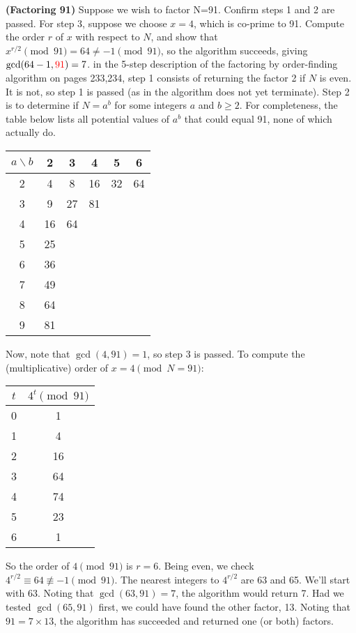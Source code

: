  \textbf{(Factoring 91)} Suppose we wish to factor N=91.  Confirm steps 1 and 2 are passed.  For step 3, suppose we choose $x=4$, which is co-prime to 91.  Compute the order $r$ of $x$ with respect to $N$, and show that $x^{r/2}\pmod{91}=64 \neq -1 \pmod{91}$, so the algorithm succeeds, giving $\gcd(64-1,{\color{red}91})=7$.
\Soln in the 5-step description of the factoring by order-finding algorithm on pages 233,234, step 1 consists of returning the factor 2 if $N$ is even.  It is not, so step 1 is passed (as in the algorithm does not yet terminate).  Step 2 is to determine if $N=a^b$ for some integers $a$ and $b\geq 2$.  For completeness, the table below lists all potential values of $a^b$ that could equal 91, none of which actually do.
\vspace{-8pt}
\begin{center}
\begin{tabular}{|c||c|c|c|c|c|}
\hline
$a \backslash b$ & 2 & 3 & 4 & 5 & 6 \\
\hline
\hline
2 & 4 & 8 & 16 & 32 & 64\\
\hline
3 & 9 & 27 & 81 \\
\hline
4 & 16 & 64 \\
\hline
5 & 25 \\
\hline
6 & 36 \\
\hline
7 & 49 \\
\hline
8 & 64 \\
\hline
9 & 81 \\
\hline 
\end{tabular}
\end{center}
\vspace{-8pt}
Now, note that $\gcd(4,91)=1$, so step 3 is passed. To compute the (multiplicative) order of $x=4\pmod{N=91}$:
\vspace{-12pt}
\begin{center}
\begin{tabular}{|c|c|}
\hline
$t$ & $4^t \pmod{91}$ \\
\hline
\hline
0 & 1 \\
\hline
1 & 4 \\
\hline
2 & 16 \\
\hline
3 & 64 \\
\hline
4 & 74 \\
\hline
5 & 23  \\
\hline
\hline
6 & 1  \\
\hline
\end{tabular}
\end{center}
\vspace{-8pt}
So the order of $4 \pmod{91}$ is $r=6$.  Being even, we check $4^{r/2} \equiv 64 \not\equiv -1 \pmod{91}$.  The nearest integers to $4^{r/2}$ are 63 and 65.  We'll start with 63.  Noting that $\gcd(63,91) = 7$, the algorithm would return 7.  Had we tested $\gcd(65,91)$ first, we could have found the other factor, 13.  Noting that $91=7\times13$, the algorithm has succeeded and returned one (or both) factors.


